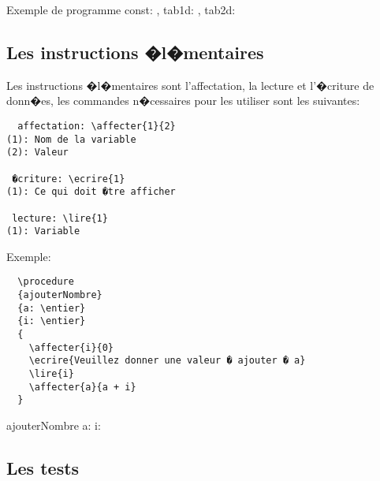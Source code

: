 \documentclass[a4paper,12pt]{report}
\begin{document}
\begin{algorithme}
  \algo
  {\normalsize}
  {Exemple de programme}
  {}
  {
  const: ,
  tab1d: ,
  tab2d: 
  }
  {}
  {}
  {}
  {\instruction{}}
\end{algorithme}



\subsection{Les instructions �l�mentaires}
Les instructions �l�mentaires sont l'affectation, la lecture et l'�criture de donn�es, les commandes n�cessaires pour les utiliser sont les suivantes:
\begin{lstlisting}
  affectation: \affecter{1}{2}
(1): Nom de la variable
(2): Valeur

 �criture: \ecrire{1}
(1): Ce qui doit �tre afficher

 lecture: \lire{1}
(1): Variable
\end{lstlisting}

Exemple:

\begin{lstlisting}
  \procedure
  {ajouterNombre}
  {a: \entier}
  {i: \entier}
  {
    \affecter{i}{0}
    \ecrire{Veuillez donner une valeur � ajouter � a}
    \lire{i}
    \affecter{a}{a + i}
  }
\end{lstlisting}


\begin{algorithme}
  \procedure
  {ajouterNombre}
  {a: \entier}
  {i: \entier}
  {
  }
\end{algorithme}

\subsection {Les tests}
\end{document}
